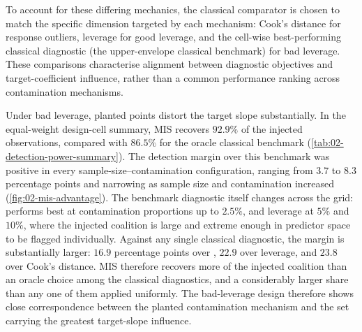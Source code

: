 \documentclass[../main.tex]{subfiles}
\begin{document}
To account for these differing mechanics, the classical comparator is chosen to match the specific dimension targeted by each mechanism: Cook's distance for response outliers, leverage for good leverage, and the cell-wise best-performing classical diagnostic (the upper-envelope classical benchmark) for bad leverage. These comparisons characterise alignment between diagnostic objectives and target-coefficient influence, rather than a common performance ranking across contamination mechanisms.

Under bad leverage, planted points distort the target slope substantially. In the equal-weight design-cell summary, MIS recovers \(92.9\%\) of the injected observations, compared with \(86.5\%\) for the oracle classical benchmark (\autoref{tab:02-detection-power-summary}). The detection margin over this benchmark was positive in every sample-size--contamination configuration, ranging from \(3.7\) to \(8.3\) percentage points and narrowing as sample size and contamination increased (\autoref{fig:02-mis-advantage}). The benchmark diagnostic itself changes across the grid: \dfbetas{} performs best at contamination proportions up to \(2.5\%\), and leverage at \(5\%\) and \(10\%\), where the injected coalition is large and extreme enough in predictor space to be flagged individually. Against any single classical diagnostic, the margin is substantially larger: \(16.9\) percentage points over \dfbetas{}, \(22.9\) over leverage, and \(23.8\) over Cook's distance. MIS therefore recovers more of the injected coalition than an oracle choice among the classical diagnostics, and a considerably larger share than any one of them applied uniformly. The bad-leverage design therefore shows close correspondence between the planted contamination mechanism and the set carrying the greatest target-slope influence.


\end{document}
